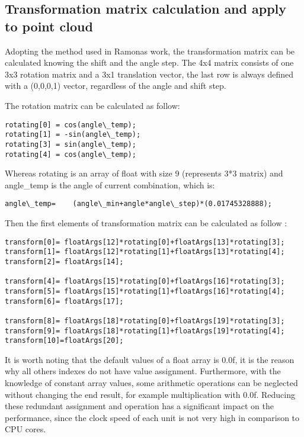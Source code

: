 \subsection{Transformation matrix calculation and apply to point cloud
}
Adopting the method used in Ramonas work, the transformation matrix can be calculated knowing the shift and the angle step. The 4x4  matrix consists of one 3x3 rotation matrix and a 3x1 translation vector, the last row is always defined with a (0,0,0,1) vector, regardless of the angle and shift step. 

The rotation matrix can be calculated as follow:

\begin{lstlisting}
rotating[0] = cos(angle\_temp);
rotating[1] = -sin(angle\_temp);
rotating[3] = sin(angle\_temp);
rotating[4] = cos(angle\_temp);
\end{lstlisting}

Whereas rotating is an array of float with size 9 (represents 3*3 matrix) and angle\_temp is the angle of current combination, which is:
\begin{lstlisting}
angle\_temp=    (angle\_min+angle*angle\_step)*(0.01745328888);
\end{lstlisting}
Then the first elements of transformation matrix can be calculated as follow :
\begin{lstlisting}
transform[0]= floatArgs[12]*rotating[0]+floatArgs[13]*rotating[3];
transform[1]= floatArgs[12]*rotating[1]+floatArgs[13]*rotating[4];
transform[2]= floatArgs[14];

transform[4]= floatArgs[15]*rotating[0]+floatArgs[16]*rotating[3];
transform[5]= floatArgs[15]*rotating[1]+floatArgs[16]*rotating[4];
transform[6]= floatArgs[17];

transform[8]= floatArgs[18]*rotating[0]+floatArgs[19]*rotating[3];
transform[9]= floatArgs[18]*rotating[1]+floatArgs[19]*rotating[4];
transform[10]=floatArgs[20];
\end{lstlisting}

It is worth noting that the default values of a float array is 0.0f, it is the reason why all others indexes do not have value assignment. Furthermore, with the knowledge of constant array values, some arithmetic operations can be neglected without changing the end result, for example multiplication with 0.0f. Reducing these redundant assignment and operation has a significant impact on the performance, since the clock speed of each unit is not very high in comparison to CPU cores. 

